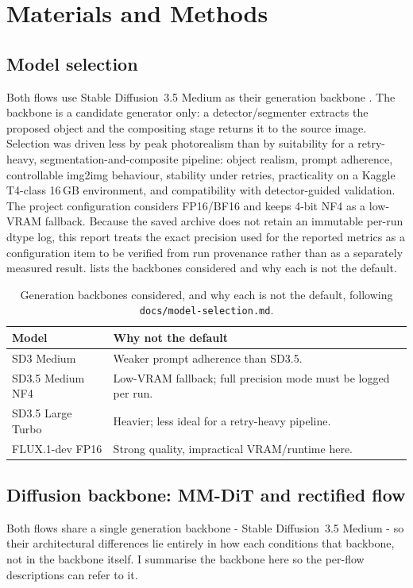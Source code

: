 \documentclass[11pt,a4paper]{article}
\begin{document}
\section{Materials and Methods}\label{sec:methods}

\subsection{Model selection}\label{sec:model-selection}
Both flows use Stable Diffusion~3.5 Medium as their generation backbone
\cite{sd35}. The backbone is a candidate generator only: a detector/segmenter
extracts the proposed object and the compositing stage returns it to the source
image. Selection was driven less by peak photorealism than by suitability for a
retry-heavy, segmentation-and-composite pipeline: object realism, prompt adherence,
controllable img2img behaviour, stability under retries, practicality on a Kaggle
T4-class 16\,GB environment, and compatibility with detector-guided validation.
The project configuration considers FP16/BF16 and keeps 4-bit NF4 as a low-VRAM
fallback. Because the saved archive does not retain an immutable per-run dtype log,
this report treats the exact precision used for the reported metrics as a
configuration item to be verified from run provenance rather than as a separately
measured result.  lists the backbones considered and why each is
not the default.

\begin{table}[t]
  \centering
  \caption[Model selection]{Generation backbones considered, and why each is not
  the default, following \texttt{docs/model-selection.md}.}
  \label{tab:models}
  \begin{tabular}{@{}ll@{}}
    \toprule
    Model & Why not the default \\
    \midrule
    SD3 Medium                & Weaker prompt adherence than SD3.5. \\
    SD3.5 Medium NF4          & Low-VRAM fallback; full precision mode must be logged per run. \\
    SD3.5 Large Turbo         & Heavier; less ideal for a retry-heavy pipeline. \\
    FLUX.1-dev FP16           & Strong quality, impractical VRAM/runtime here. \\
    \bottomrule
  \end{tabular}
\end{table}

\subsection{Diffusion backbone: MM-DiT and rectified flow}\label{sec:backbone}
Both flows share a single generation backbone - Stable Diffusion~3.5
Medium - so their architectural differences lie entirely in how each
conditions that backbone, not in the backbone itself. I summarise the
backbone here so the per-flow descriptions can refer to it.
\end{document}
